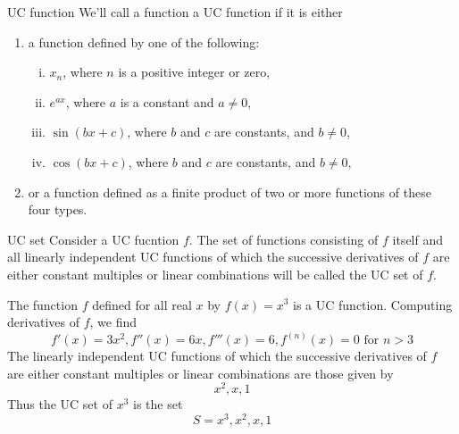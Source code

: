 \begin{definition}{UC function}{}
    We'll call a function a UC function if it is either
    \begin{enumerate}
        \item a function defined by one of the following:
            \begin{enumerate}[(i)]
                \item $x_n$, where $n$ is a positive integer or zero,
                \item $e^{ax}$, where $a$ is a constant and $a \neq 0$,
                \item $\sin{(bx+c)}$, where $b$ and $c$ are constants, and $b \neq 0$,
                \item $\cos{(bx+c)}$, where $b$ and $c$ are constants, and $b \neq 0$,
            \end{enumerate}
        \item or a function defined as a finite product of two or more functions of these four types.
    \end{enumerate}
\end{definition}

\begin{definition}{UC set}{}
    Consider a UC fucntion $f$. The set of functions consisting of $f$ itself and all linearly independent UC functions of which the successive derivatives of $f$ are either constant multiples or linear combinations will be called the UC set of $f$.
\end{definition}

\begin{example}{}{}
    The function $f$ defined for all real $x$ by $f(x)=x^3$ is a UC function. Computing derivatives of $f$, we find \[
        f'(x) = 3x^2, f''(x) = 6x, f'''(x) = 6, f^{(n)}(x) = 0 \text{ for } n>3
    \]
    The linearly independent UC functions of which the successive derivatives of $f$ are either constant multiples or linear combinations are those given by \[
        x^2, x, 1
    \]
    Thus the UC set of $x^3$ is the set \[
        S = {x^3, x^2, x, 1}
    \]
\end{example}


